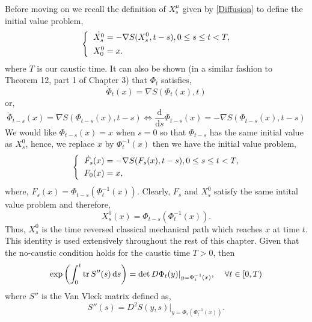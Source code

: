 \documentclass[a4paper,12pt,draft]{report}
\theoremstyle{remark}
\theoremstyle{definition}
\begin{document}
Before moving on we recall the definition of $X_s^\mu$ given by \eqref{Diffusion} to define the initial value problem,
$$
\left\{
\begin{aligned}
\dot{X_s^0} & = -\nabla S(X_s^0, t - s), 0 \le s \le t < T,\\
\hspace{0.2cm}X_0^0 & = x.
\end{aligned}
\right.
$$
where $T$ is our caustic time.  It can also be shown (in a similar fashion to Theorem 12, part 1 of Chapter 3) that $\Phi_t$ satisfies,
$$
\dot{\Phi}_t(x) = \nabla S(\Phi_t(x), t)
$$
or,
$$
\dot{\Phi}_{t - s}(x) = \nabla S(\Phi_{t - s}(x), t - s) \Leftrightarrow \frac{\mathrm{d}}{\mathrm{d} s}\Phi_{t - s}(x) = -\nabla S(\Phi_{t - s}(x), t - s)
$$
We would like $\Phi_{t - s}(x) = x$ when $s = 0$ so that $\Phi_{t - s}$ has the same initial value as $X_s^0$, hence, we replace $x$ by $\Phi_t^{-1}(x)$ then we have the initial value problem,
$$
\left\{
\begin{aligned}
\dot{F_s}(x) & = -\nabla S(F_s(x), t - s), 0 \le s \le t < T,\\
\hspace{0.2cm}F_0(x) & = x,
\end{aligned}
\right.
$$
where, $F_s(x) = \Phi_{t - s}(\Phi_t^{-1}(x))$.  Clearly, $F_s$ and $X_s^0$ satisfy the same intital value problem and therefore,
$$
X_s^0(x) = \Phi_{t - s}(\Phi_t^{-1}(x)).
$$
Thus, $X_s^0$ is the time reversed classical mechanical path which reaches $x$ at time $t$.  This identity is used extensively throughout the rest of this chapter.
\theorem
{
Given that the no-caustic condition holds for the caustic time $T > 0$, then
$$
\exp\left(\int_0^t \mathrm{tr}\,S''(s)\,\mathrm{d}s\right) = \det D\Phi_t(y)|_{y = \Phi_t^{-1}(x)}, \hspace{0.4cm}\forall t \in [0, T)
$$
where $S''$ is the Van Vleck matrix defined as,
$$
S''(s) = D^2S(y, s)|_{y = \Phi_s(\Phi_t^{-1}(x))}.
$$
}
\proof
\end{document}
